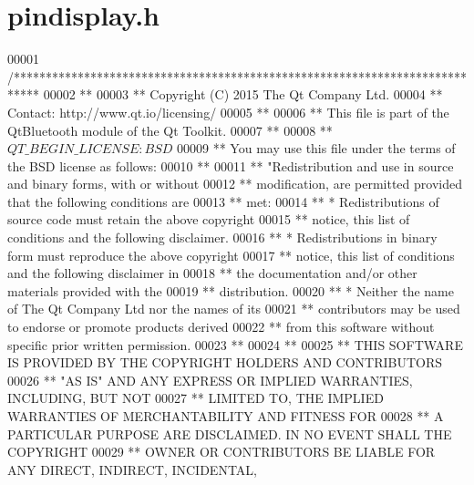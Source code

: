 \hypertarget{pindisplay_8h_source}{}\section{pindisplay.\+h}
\label{pindisplay_8h_source}

\begin{DoxyCode}
00001 \textcolor{comment}{/****************************************************************************}
00002 \textcolor{comment}{**}
00003 \textcolor{comment}{** Copyright (C) 2015 The Qt Company Ltd.}
00004 \textcolor{comment}{** Contact: http://www.qt.io/licensing/}
00005 \textcolor{comment}{**}
00006 \textcolor{comment}{** This file is part of the QtBluetooth module of the Qt Toolkit.}
00007 \textcolor{comment}{**}
00008 \textcolor{comment}{** $QT\_BEGIN\_LICENSE:BSD$}
00009 \textcolor{comment}{** You may use this file under the terms of the BSD license as follows:}
00010 \textcolor{comment}{**}
00011 \textcolor{comment}{** "Redistribution and use in source and binary forms, with or without}
00012 \textcolor{comment}{** modification, are permitted provided that the following conditions are}
00013 \textcolor{comment}{** met:}
00014 \textcolor{comment}{**   * Redistributions of source code must retain the above copyright}
00015 \textcolor{comment}{**     notice, this list of conditions and the following disclaimer.}
00016 \textcolor{comment}{**   * Redistributions in binary form must reproduce the above copyright}
00017 \textcolor{comment}{**     notice, this list of conditions and the following disclaimer in}
00018 \textcolor{comment}{**     the documentation and/or other materials provided with the}
00019 \textcolor{comment}{**     distribution.}
00020 \textcolor{comment}{**   * Neither the name of The Qt Company Ltd nor the names of its}
00021 \textcolor{comment}{**     contributors may be used to endorse or promote products derived}
00022 \textcolor{comment}{**     from this software without specific prior written permission.}
00023 \textcolor{comment}{**}
00024 \textcolor{comment}{**}
00025 \textcolor{comment}{** THIS SOFTWARE IS PROVIDED BY THE COPYRIGHT HOLDERS AND CONTRIBUTORS}
00026 \textcolor{comment}{** "AS IS" AND ANY EXPRESS OR IMPLIED WARRANTIES, INCLUDING, BUT NOT}
00027 \textcolor{comment}{** LIMITED TO, THE IMPLIED WARRANTIES OF MERCHANTABILITY AND FITNESS FOR}
00028 \textcolor{comment}{** A PARTICULAR PURPOSE ARE DISCLAIMED. IN NO EVENT SHALL THE COPYRIGHT}
00029 \textcolor{comment}{** OWNER OR CONTRIBUTORS BE LIABLE FOR ANY DIRECT, INDIRECT, INCIDENTAL,}

\end{DoxyCode}
